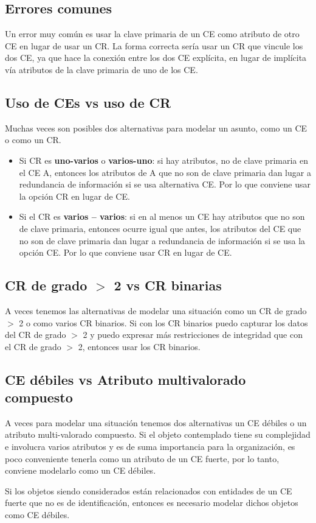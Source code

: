 \documentclass[12pt,a4paper]{report}
\begin{document}
		\subsection{Errores comunes}
			\par Un error muy común es usar la clave primaria de un CE como atributo de otro CE en lugar de usar un CR. La forma correcta sería usar un CR que vincule los dos CE, ya que hace la conexión entre los dos CE explícita, en lugar de implícita vía atributos de la clave primaria de uno de los CE.	
		
		\subsection{Uso de CEs vs uso de CR}
			\par Muchas veces son posibles dos alternativas para modelar un asunto, como un CE o como un CR.
			\begin{itemize}
				\item Si CR es \textbf{uno-varios} o \textbf{varios-uno}: si hay atributos, no de clave primaria en el CE A, entonces los atributos de A que no son de clave primaria dan lugar a redundancia de información si se usa alternativa CE. Por lo que conviene usar la opción CR en lugar de CE.
				\item Si el CR es \textbf{varios – varios}: si en al menos un CE hay atributos que no son de clave primaria, entonces ocurre igual que antes, los atributos del CE que no son de clave primaria dan lugar a redundancia de información si se usa la opción CE. Por lo que conviene usar CR en lugar de CE.
			\end{itemize}
		
		\subsection{CR de grado $>$ 2 vs CR binarias}
			\par A veces tenemos las alternativas de modelar una situación como un CR de grado $>$ 2 o como varios CR binarios. Si con los CR binarios puedo capturar los datos del CR de grado $>$ 2 y puedo expresar más restricciones de integridad que con el CR de grado $>$ 2, entonces usar los CR binarios.
		
		\subsection{CE débiles vs Atributo multivalorado compuesto}
			\par A veces para modelar una situación tenemos dos alternativas un CE débiles o un atributo multi-valorado compuesto. Si el objeto contemplado tiene su complejidad e involucra varios atributos y es de suma importancia para la organización, es poco conveniente tenerla como un atributo de un CE fuerte, por lo tanto, conviene modelarlo como un CE débiles.
			\par Si los objetos siendo considerados están relacionados con entidades de un CE fuerte que no es de identificación, entonces es necesario modelar dichos objetos como CE débiles.
		
\end{document}

